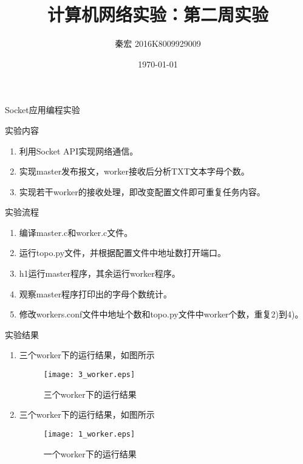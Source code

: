 \documentclass{article} %
\title{计算机网络实验：第二周实验}  %
\author{秦宏 2016K8009929009}   %
\date{\today}       %
\begin{document}
	\maketitle          %
	\begin{section}{Socket应用编程实验}
		\begin{subsection}{实验内容}
			\begin{enumerate}[1)]
				\item 利用Socket API实现网络通信。
				\item 实现master发布报文，worker接收后分析TXT文本字母个数。
				\item 实现若干worker的接收处理，即改变配置文件即可重复任务内容。
			\end{enumerate}
			\end{subsection}
		\begin{subsection}{实验流程}
			\begin{enumerate}[1)]
				\item 编译master.c和worker.c文件。
				\item 运行topo.py文件，并根据配置文件中地址数打开端口。
				\item h1运行master程序，其余运行worker程序。
				\item 观察master程序打印出的字母个数统计。
				\item 修改workers.conf文件中地址个数和topo.py文件中worker个数，重复2)到4)。
			\end{enumerate}
			\end{subsection}
		\begin{subsection}{实验结果}
			\begin{enumerate}[1)]
				\item 三个worker下的运行结果，如图所示\\
					\begin{figure}[htb]	
						\centering
						\texttt{[image: 3\_worker.eps]}	
						\caption{三个worker下的运行结果}
					\end{figure}
				\item 三个worker下的运行结果，如图所示\\
				\begin{figure}[!htb]	
					\centering
					\texttt{[image: 1\_worker.eps]}	
					\caption{一个worker下的运行结果}

\end{figure}
\end{enumerate}
\end{subsection}
\end{section}
\end{document}
